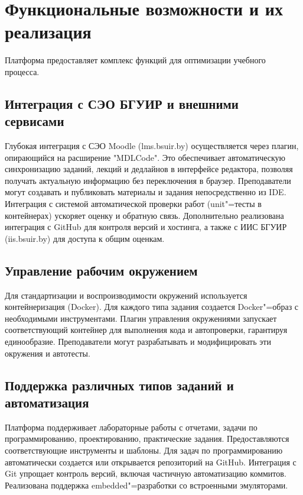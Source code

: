 \documentclass{bsuir}
\begin{document}
\section{Функциональные возможности и их реализация}

Платформа предоставляет комплекс функций для оптимизации учебного процесса.

\subsection{Интеграция с СЭО БГУИР и внешними сервисами}

Глубокая интеграция с СЭО Moodle (lms.bsuir.by) осуществляется через плагин,
опирающийся на расширение "MDLCode". Это обеспечивает автоматическую
синхронизацию заданий, лекций и дедлайнов в интерфейсе редактора, позволяя
получать актуальную информацию без переключения в браузер. Преподаватели могут
создавать и публиковать материалы и задания непосредственно из IDE. Интеграция с
системой автоматической проверки работ (unit"=тесты в контейнерах) ускоряет
оценку и обратную связь. Дополнительно реализована интеграция с GitHub для
контроля версий и хостинга, а также с ИИС БГУИР (iis.bsuir.by) для доступа к
общим оценкам.

\subsection{Управление рабочим окружением}

Для стандартизации и воспроизводимости окружений используется контейнеризация
(Docker). Для каждого типа задания создается Docker"=образ с необходимыми
инструментами. Плагин управления окружениями запускает соответствующий контейнер
для выполнения кода и автопроверки, гарантируя единообразие. Преподаватели могут
разрабатывать и модифицировать эти окружения и автотесты.

\subsection{Поддержка различных типов заданий и автоматизация}

Платформа поддерживает лабораторные работы с отчетами, задачи по
программированию, проектированию, практические задания. Предоставляются
соответствующие инструменты и шаблоны. Для задач по программированию
автоматически создается или открывается репозиторий на GitHub. Интеграция с Git
упрощает контроль версий, включая частичную автоматизацию коммитов. Реализована
поддержка embedded"=разработки со встроенными эмуляторами.
\end{document}
